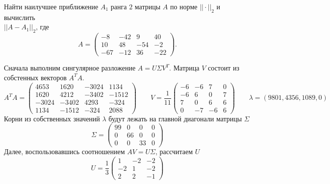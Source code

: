
\begin{problem}
    Найти наилучшее приближение $A_1$ ранга $2$ матрицы $A$ по норме
    $||\cdot||_2$ и вычислить\\ $||A - A_1||_2$, где
    \begin{equation*}
        A =
        \begin{pmatrix}
            -8 & -42 & 9 & 40\\
            10 & 48 & -54 & -2\\
            -67 & -12 & 36 & -22
        \end{pmatrix}.
    \end{equation*}
\end{problem}


Сначала выполним сингулярное разложение $A = U \Sigma V^T$. Матрица $V$
состоит из собстенных векторов $A^TA$.
\begin{equation*}
    A^TA = \begin{pmatrix}
        4653 & 1620 & -3024 & 1134\\
        1620 & 4212 & -3402 & -1512\\
        -3024 & -3402 & 4293 & -324\\
        1134 & -1512 & -324 & 2088
    \end{pmatrix}
    \qquad
    V = \frac{1}{11}
    \begin{pmatrix}
        -6 & -6 & 7 & 0\\
        -6 & 6 & 0 & 7\\
        7 & 0 & 6 & 6\\
        0 & -7 & -6 & 6
    \end{pmatrix}
    \qquad
    \lambda = (9801, 4356, 1089, 0)
\end{equation*}
Корни из собственных значений $\lambda$ будут лежать на главной диагонали
матрицы $\Sigma$
\begin{equation*}
    \Sigma = \begin{pmatrix}
        99 & 0 & 0 & 0\\
        0 & 66 & 0 & 0\\
        0 & 0 & 33 & 0
    \end{pmatrix}
\end{equation*}
Далее, воспользовавшись соотношением $AV = U\Sigma$, рассчитаем $U$
\begin{equation*}
    U = \frac{1}{3}
    \begin{pmatrix}
        1 & -2 & -2\\
        -2 & 1 & -2\\
        2 & 2 & -1
    \end{pmatrix}
\end{equation*}

